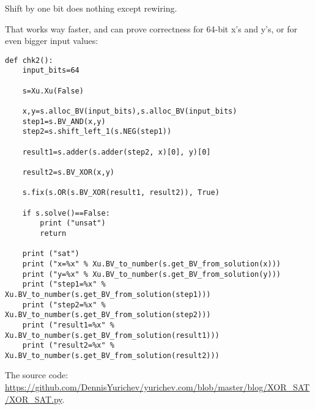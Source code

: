 Shift by one bit does nothing except rewiring.

That works way faster, and can prove correctness for 64-bit x's and y's, or for even bigger input values:

\begin{lstlisting}
def chk2():
    input_bits=64

    s=Xu.Xu(False)

    x,y=s.alloc_BV(input_bits),s.alloc_BV(input_bits)
    step1=s.BV_AND(x,y)
    step2=s.shift_left_1(s.NEG(step1))

    result1=s.adder(s.adder(step2, x)[0], y)[0]

    result2=s.BV_XOR(x,y)

    s.fix(s.OR(s.BV_XOR(result1, result2)), True)

    if s.solve()==False:
        print ("unsat")
        return

    print ("sat")
    print ("x=%x" % Xu.BV_to_number(s.get_BV_from_solution(x)))
    print ("y=%x" % Xu.BV_to_number(s.get_BV_from_solution(y)))
    print ("step1=%x" % Xu.BV_to_number(s.get_BV_from_solution(step1)))
    print ("step2=%x" % Xu.BV_to_number(s.get_BV_from_solution(step2)))
    print ("result1=%x" % Xu.BV_to_number(s.get_BV_from_solution(result1)))
    print ("result2=%x" % Xu.BV_to_number(s.get_BV_from_solution(result2)))
\end{lstlisting}

The source code: \url{https://github.com/DennisYurichev/yurichev.com/blob/master/blog/XOR_SAT/XOR_SAT.py}.

